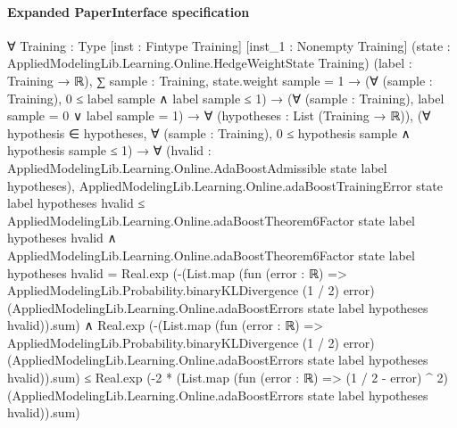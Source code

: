 \documentclass[10pt]{article}
\begin{document}
\paragraph{Expanded PaperInterface specification}
\begin{ReviewVerbatim}
∀ {Training : Type} [inst : Fintype Training] [inst_1 : Nonempty Training]
  (state : AppliedModelingLib.Learning.Online.HedgeWeightState Training) (label : Training → ℝ),
  ∑ sample : Training, state.weight sample = 1 →
    (∀ (sample : Training), 0 ≤ label sample ∧ label sample ≤ 1) →
      (∀ (sample : Training), label sample = 0 ∨ label sample = 1) →
        ∀ (hypotheses : List (Training → ℝ)),
          (∀ hypothesis ∈ hypotheses, ∀ (sample : Training), 0 ≤ hypothesis sample ∧ hypothesis sample ≤ 1) →
            ∀ (hvalid : AppliedModelingLib.Learning.Online.AdaBoostAdmissible state label hypotheses),
              AppliedModelingLib.Learning.Online.adaBoostTrainingError state label hypotheses hvalid ≤
                  AppliedModelingLib.Learning.Online.adaBoostTheorem6Factor state label hypotheses hvalid ∧
                AppliedModelingLib.Learning.Online.adaBoostTheorem6Factor state label hypotheses hvalid =
                    Real.exp
                      (-(List.map (fun (error : ℝ) => AppliedModelingLib.Probability.binaryKLDivergence (1 / 2) error)
                            (AppliedModelingLib.Learning.Online.adaBoostErrors state label hypotheses hvalid)).sum) ∧
                  Real.exp
                      (-(List.map (fun (error : ℝ) => AppliedModelingLib.Probability.binaryKLDivergence (1 / 2) error)
                            (AppliedModelingLib.Learning.Online.adaBoostErrors state label hypotheses hvalid)).sum) ≤
                    Real.exp
                      (-2 *
                        (List.map (fun (error : ℝ) => (1 / 2 - error) ^ 2)
                            (AppliedModelingLib.Learning.Online.adaBoostErrors state label hypotheses hvalid)).sum)
\end{ReviewVerbatim}
\end{document}
